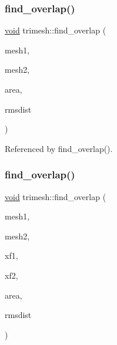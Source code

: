 \subsubsection{\texorpdfstring{find\+\_\+overlap()}{find\_overlap()}\hspace{0.1cm}{\footnotesize\ttfamily [1/3]}}
{\footnotesize\ttfamily \hyperlink{namespacetrimesh_a784ddfd979e1c579bda795a8edfc3f43}{void} trimesh\+::find\+\_\+overlap (\begin{DoxyParamCaption}\item[{\hyperlink{classtrimesh_1_1TriMesh}{Tri\+Mesh} $\ast$}]{mesh1,  }\item[{\hyperlink{classtrimesh_1_1TriMesh}{Tri\+Mesh} $\ast$}]{mesh2,  }\item[{float \&}]{area,  }\item[{float \&}]{rmsdist }\end{DoxyParamCaption})}



Referenced by find\+\_\+overlap().

\mbox{\label{namespacetrimesh_a317544eacae9d2ab40961b745321a82f}} 
\subsubsection{\texorpdfstring{find\+\_\+overlap()}{find\_overlap()}\hspace{0.1cm}{\footnotesize\ttfamily [2/3]}}
{\footnotesize\ttfamily \hyperlink{namespacetrimesh_a784ddfd979e1c579bda795a8edfc3f43}{void} trimesh\+::find\+\_\+overlap (\begin{DoxyParamCaption}\item[{\hyperlink{classtrimesh_1_1TriMesh}{Tri\+Mesh} $\ast$}]{mesh1,  }\item[{\hyperlink{classtrimesh_1_1TriMesh}{Tri\+Mesh} $\ast$}]{mesh2,  }\item[{const \hyperlink{namespacetrimesh_ad504958f2f56e393991b848986a8459f}{xform} \&}]{xf1,  }\item[{const \hyperlink{namespacetrimesh_ad504958f2f56e393991b848986a8459f}{xform} \&}]{xf2,  }\item[{float \&}]{area,  }\item[{float \&}]{rmsdist }\end{DoxyParamCaption})}

\mbox{\label{namespacetrimesh_a3cba50c5fc7eb4957838dfbf00e131e1}} 
